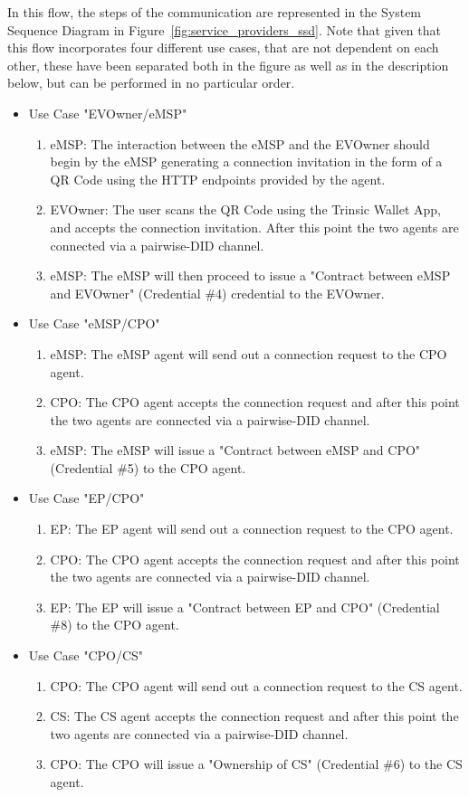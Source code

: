 In this flow, the steps of the communication are represented in the System Sequence Diagram in Figure~\ref{fig:service_providers_ssd}. Note that given that this flow incorporates four different use cases, that are not dependent on each other, these have been separated both in the figure as well as in the description below, but can be performed in no particular order.

\begin{itemize}
    \item Use Case "EVOwner/eMSP"
    \begin{enumerate}
        \item eMSP: The interaction between the eMSP and the EVOwner should begin by the eMSP generating a connection invitation in the form of a QR Code using the HTTP endpoints provided by the agent. 
        \item EVOwner: The user scans the QR Code using the Trinsic Wallet App, and accepts the connection invitation. After this point the two agents are connected via a pairwise-DID channel.
        \item eMSP: The eMSP will then proceed to issue a "Contract between eMSP and EVOwner" (Credential \#4) credential to the EVOwner.
    \end{enumerate}
    \item Use Case "eMSP/CPO"
    \begin{enumerate}
        \item eMSP: The eMSP agent will send out a connection request to the CPO agent.
        \item CPO: The CPO agent accepts the connection request and after this point the two agents are connected via a pairwise-DID channel.
        \item eMSP: The eMSP will issue a "Contract between eMSP and CPO" (Credential \#5) to the CPO agent.
    \end{enumerate}
    \item Use Case "EP/CPO"
    \begin{enumerate}
        \item EP: The EP agent will send out a connection request to the CPO agent.
        \item CPO: The CPO agent accepts the connection request and after this point the two agents are connected via a pairwise-DID channel.
        \item EP: The EP will issue a "Contract between EP and CPO" (Credential \#8) to the CPO agent. 
    \end{enumerate}
    \item Use Case "CPO/CS"
    \begin{enumerate}
        \item CPO: The CPO agent will send out a connection request to the CS agent.
        \item CS: The CS agent accepts the connection request and after this point the two agents are connected via a pairwise-DID channel.
        \item CPO: The CPO will issue a "Ownership of CS" (Credential \#6) to the CS agent. 
    \end{enumerate}
\end{itemize}

